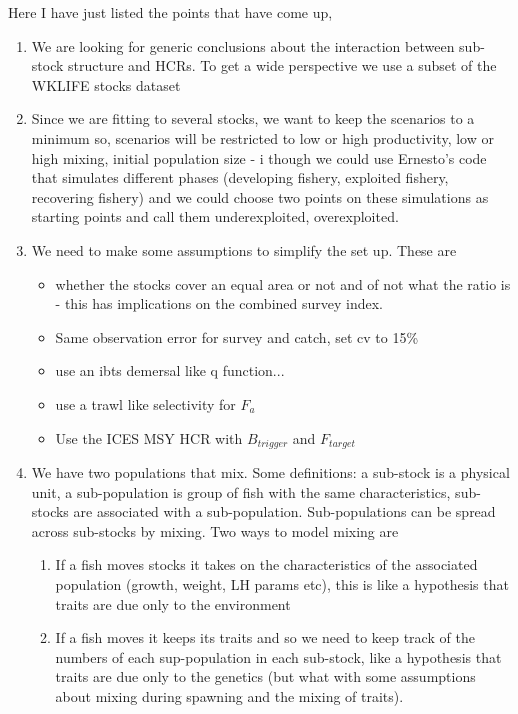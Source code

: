 \documentclass[a4paper,english]{article}
\begin{document}
Here I have just listed the points that have come up, 

\begin{enumerate}
  \item We are looking for generic conclusions about the interaction between sub-stock structure and HCRs.  To get a wide perspective we use a subset of the WKLIFE stocks dataset
  \item Since we are fitting to several stocks, we want to keep the scenarios to a minimum so, scenarios will be restricted to low or high productivity, low or high mixing, initial population size - i though we could use Ernesto's code that simulates different phases (developing fishery, exploited fishery, recovering fishery) and we could choose two points on these simulations as starting points and call them underexploited, overexploited.
  \item We need to make some assumptions to simplify the set up.  These are 
  \begin{itemize} 
    \item whether the stocks cover an equal area or not and of not what the ratio is - this has implications on the combined survey index.
    \item Same observation error for survey and catch, set cv to 15\%
    \item use an ibts demersal like q function...
    \item use a trawl like selectivity for $F_a$
    \item Use the ICES MSY HCR with $B_{trigger}$ and $F_{target}$
  \end{itemize}
  \item We have two populations that mix.  Some definitions: a sub-stock is a physical unit, a sub-population is group of fish with the same characteristics, sub-stocks are associated with a sub-population.  Sub-populations can be spread across sub-stocks by mixing.  Two ways to model mixing are 
    \begin{enumerate}
      \item If a fish moves stocks it takes on the characteristics of the associated population (growth, weight, LH params etc), this is like a hypothesis that traits are due only to the environment
      \item If a fish moves it keeps its traits and so we need to keep track of the numbers of each sup-population in each sub-stock, like a hypothesis that traits are due only to the genetics (but what with some assumptions about mixing during spawning and the mixing of traits).

\end{enumerate}
\end{enumerate}
\end{document}
